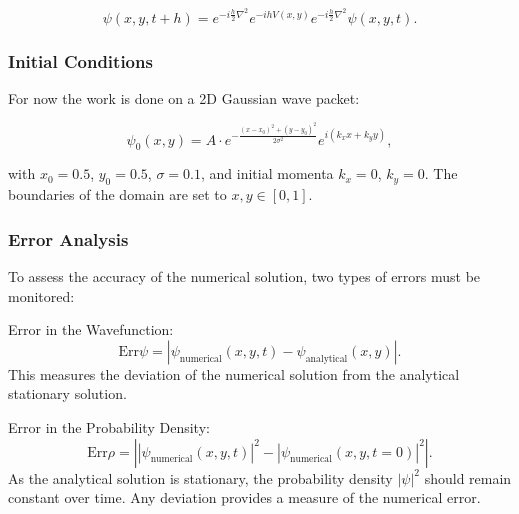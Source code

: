 \begin{equation}
\psi(x,y,t+h) = e^{-i \frac{h}{2} \nabla^2} e^{-i h V(x,y)} e^{-i \frac{h}{2} \nabla^2} \psi(x,y,t).
\end{equation}

\subsubsection*{Initial Conditions}

For now the work is done on a 2D Gaussian wave packet:

\begin{equation}
\psi_0(x, y) = A \cdot e^{-\frac{(x-x_0)^2 + (y-y_0)^2}{2\sigma^2}} e^{i(k_x x + k_y y)},
\end{equation}

with $x_0 = 0.5$, $y_0 = 0.5$, $\sigma = 0.1$, and initial momenta $k_x = 0$, $k_y = 0$. The boundaries of the domain are set to $x, y \in [0, 1]$.

\subsubsection*{Error Analysis}

To assess the accuracy of the numerical solution, two types of errors must be monitored:

Error in the Wavefunction:
\begin{equation}
\text{Err}{\psi} = \left| \psi_{\text{numerical}}(x,y,t) - \psi_{\text{analytical}}(x,y) \right|.
\end{equation}
This measures the deviation of the numerical solution from the analytical stationary solution.

Error in the Probability Density:
\begin{equation}
\text{Err}{\rho} = \left| \left| \psi_{\text{numerical}}(x,y,t) \right|^2 - \left| \psi_{\text{numerical}}(x,y,t=0) \right|^2 \right|.
\end{equation}
As the analytical solution is stationary, the probability density $|\psi|^2$ should remain constant over time. Any deviation provides a measure of the numerical error.



